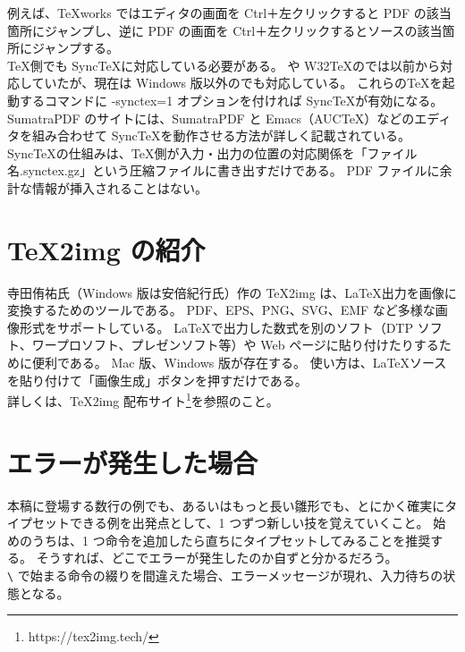 例えば、\TeX{}works ではエディタの画面を Ctrl＋左クリックすると PDF の該当箇所にジャンプし、逆に PDF の画面を Ctrl＋左クリックするとソースの該当箇所にジャンプする。\\

\TeX{}側でも Sync\TeX{}に対応している必要がある。
\pdfTeX{}や W32\TeX{}の\pTeX{}では以前から対応していたが、現在は Windows 版以外の\pTeX{}でも対応している。
これらの\TeX{}を起動するコマンドに -synctex=1 オプションを付ければ Sync\TeX{}が有効になる。\\

SumatraPDF のサイトには、SumatraPDF と Emacs（AUC\TeX）などのエディタを組み合わせて Sync\TeX{}を動作させる方法が詳しく記載されている。\\

Sync\TeX{}の仕組みは、\TeX{}側が入力・出力の位置の対応関係を「ファイル名.synctex.gz」という圧縮ファイルに書き出すだけである。
PDF ファイルに余計な情報が挿入されることはない。
\section{TeX2img の紹介}
寺田侑祐{\small 氏}（Windows 版は安倍紀行{\small 氏}）作の TeX2img は、\LaTeX{}出力を画像に変換するためのツールである。
PDF、EPS、PNG、SVG、EMF など多様な画像形式をサポートしている。
\LaTeX{}で出力した数式を別のソフト（DTP ソフト、ワープロソフト、プレゼンソフト等）や Web ページに貼り付けたりするために便利である。
Mac 版、Windows 版が存在する。
使い方は、\LaTeX{}ソースを貼り付けて「画像生成」ボタンを押すだけである。\\

詳しくは、TeX2img 配布サイト\footnote{https://tex2img.tech/}を参照のこと。
\section{エラーが発生した場合}
本稿に登場する数行の例でも、あるいはもっと長い雛形でも、とにかく確実にタイプセットできる例を出発点として、1 つずつ新しい技を覚えていくこと。
始めのうちは、1 つ命令を追加したら直ちにタイプセットしてみることを推奨する。
そうすれば、どこでエラーが発生したのか自ずと分かるだろう。\\

\verb`\` で始まる命令の綴りを間違えた場合、エラーメッセージが現れ、入力待ちの状態となる。\\

